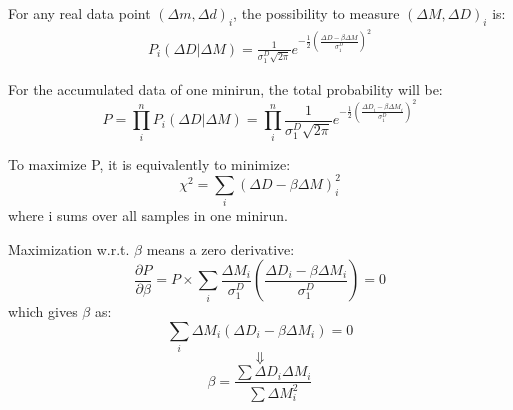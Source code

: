 For any real data point $(\Delta m, \Delta d)_i$, the possibility to measure
$(\Delta M, \Delta D)_i$ is:
\begin{equation}
    \begin{gathered}
	P_i(\Delta D|\Delta M) = \frac{1}{\sigma_1^D\sqrt{2\pi}} 
	    e^{-\frac{1}{2}\left( \frac{\Delta D - \beta\Delta M}{\sigma_1^D}\right)^2}
    \end{gathered}
\end{equation}

For the accumulated data of one minirun, the total probability will be:
\begin{equation}
    P = \prod_i^n P_i(\Delta D|\Delta M) = \prod_i^n \frac{1}{\sigma_1^D\sqrt{2\pi}} 
	    e^{-\frac{1}{2}\left( \frac{\Delta D_i - \beta\Delta M_i}{\sigma_1^D}\right)^2}
\end{equation}

To maximize P, it is equivalently to minimize:
\begin{equation}
    \chi^2 = \sum_i (\Delta D - \beta\Delta M)_i^2
    \label{eq:regression_chi2}
\end{equation}
where i sums over all samples in one minirun.

Maximization w.r.t. $\beta$ means a zero derivative:
\begin{equation}
    \frac{\partial P}{\partial \beta} = P \times 
    \sum_i \frac{\Delta M_i}{\sigma_1^D} \left( \frac{\Delta D_i - \beta\Delta M_i}{\sigma_1^D}\right)
    = 0
\end{equation}
which gives $\beta$ as:
\begin{equation}
    \sum_i \Delta M_i (\Delta D_i - \beta\Delta M_i) = 0 
\end{equation}
$$ \Downarrow $$
\begin{equation}
    \beta = \frac{\sum \Delta D_i \Delta M_i}{\sum \Delta M^2_i}
\end{equation}

